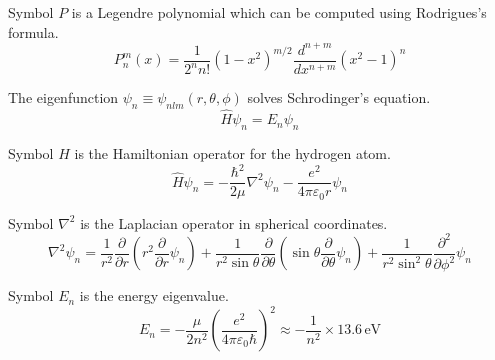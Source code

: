 Symbol $P$ is a Legendre polynomial which can be computed using Rodrigues's formula.
\begin{equation*}
P_n^m(x)=\frac{1}{2^n n!}(1-x^2)^{m/2}
\frac{d^{n+m}}{dx^{n+m}}(x^2-1)^n
\end{equation*}

The eigenfunction $\psi_n\equiv\psi_{nlm}(r,\theta,\phi)$ solves Schrodinger's equation.
\begin{equation*}
\hat{H}\psi_n=E_n\psi_n
\end{equation*}

Symbol $\hat{H}$ is the Hamiltonian operator for the hydrogen atom.
\begin{equation*}
\hat{H}\psi_n=-\frac{\hbar^2}{2\mu}\nabla^2\psi_n-\frac{e^2}{4\pi\varepsilon_0 r}\psi_n
\end{equation*}

Symbol $\nabla^2$ is the Laplacian operator in spherical coordinates.
\begin{equation*}
\nabla^2\psi_n=\frac{1}{r^2}\frac{\partial}{\partial r}
\left(r^2\frac{\partial}{\partial r}\psi_n\right)
+
\frac{1}{r^2\sin\theta}\frac{\partial}{\partial\theta}
\left(\sin\theta\frac{\partial}{\partial\theta}\psi_n\right)
+
\frac{1}{r^2\sin^2\theta}\frac{\partial^2}{\partial\phi^2}\psi_n
\end{equation*}

Symbol $E_n$ is the energy eigenvalue.
\begin{equation*}
E_n=-\frac{\mu}{2n^2}\left(\frac{e^2}{4\pi\varepsilon_0\hbar}\right)^2
\approx-\frac{1}{n^2}\times13.6\,\text{eV}
\end{equation*}


